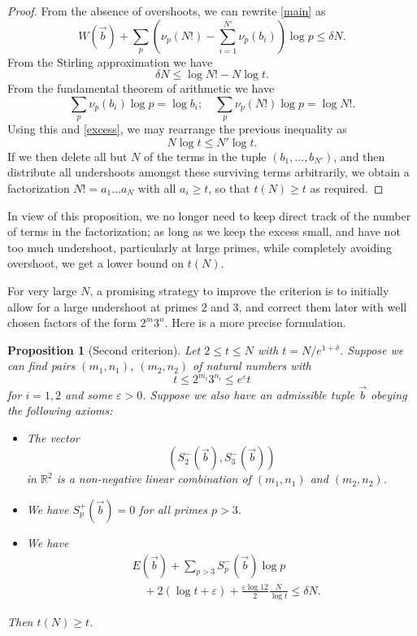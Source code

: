 \documentclass[12pt,a4paper,reqno]{amsart}
\numberwithin{equation}{section}
\theoremstyle{plain}
\newtheorem{proposition}[theorem]{Proposition}
\theoremstyle{definition}
\newcommand\R{\mathbb{R}}
\newcommand\eps{\varepsilon}
\begin{document}
\begin{proof}  From the absence of overshoots, we can rewrite \eqref{main} as
  $$  W(\vec b) + \sum_p (\nu_p(N!) - \sum_{i=1}^{N'} \nu_p(b_i))\log p \leq \delta N.$$
 From the Stirling approximation we have
 $$ \delta N \leq \log N! - N \log t.$$
From the fundamental theorem of arithmetic we have
$$ \sum_p \nu_p(b_i) \log p = \log b_i; \quad \sum_p \nu_p(N!) \log p = \log N!.$$
Using this and \eqref{excess}, we may rearrange the previous inequality as
$$ N \log t \leq N' \log t.$$
If we then delete all but $N$ of the terms in the tuple $(b_1,\dots,b_{N'})$, and then distribute all undershoots amongst these surviving terms arbitrarily, we obtain a factorization $N! = a_1 \dots a_N$ with all $a_i \geq t$, so that $t(N) \geq t$ as required.
\end{proof}

In view of this proposition, we no longer need to keep direct track of the number of terms in the factorization; as long as we keep the excess small, and have not too much undershoot, particularly at large primes, while completely avoiding overshoot, we get a lower bound on $t(N)$. 

For very large $N$, a promising strategy to improve the criterion is to initially allow for a large undershoot at primes $2$ and $3$, and correct them later with well chosen factors of the form $2^m 3^n$.  Here is a more precise formulation.

\begin{proposition}[Second criterion]  Let $2 \leq t \leq N$ with $t = N /e^{1+\delta}$.  Suppose we can find pairs $(m_1,n_1)$, $(m_2,n_2)$ of natural numbers with
\begin{equation}\label{atet}
   t \leq 2^{m_i} 3^{n_i} \leq e^\eps t
\end{equation}
for $i=1,2$ and some $\eps>0$.  Suppose we also have an admissible tuple $\vec b$ obeying the following axioms:
\begin{itemize}
  \item[(i)]  The vector
\begin{equation}\label{svec}
  (S^-_2(\vec b), S^-_3(\vec b))
\end{equation}
in $\R^2$ is a non-negative linear combination of $(m_1,n_1)$ and $(m_2,n_2)$.
  \item[(ii)] We have $S^+_p(\vec b) = 0$ for all primes $p > 3$.
  \item[(iii)]  We have
  \begin{equation}\label{main-2}
    \begin{split} 
&    E(\vec b) + \sum_{p>3} S^-_p(\vec b) \log p \\
& \quad + 2(\log t + \eps) + \frac{\eps \log 12}{2} \frac{N}{\log t} \leq \delta N.
    \end{split}
  \end{equation}
\end{itemize}
Then $t(N) \geq t$.
\end{proposition}
\end{document}
